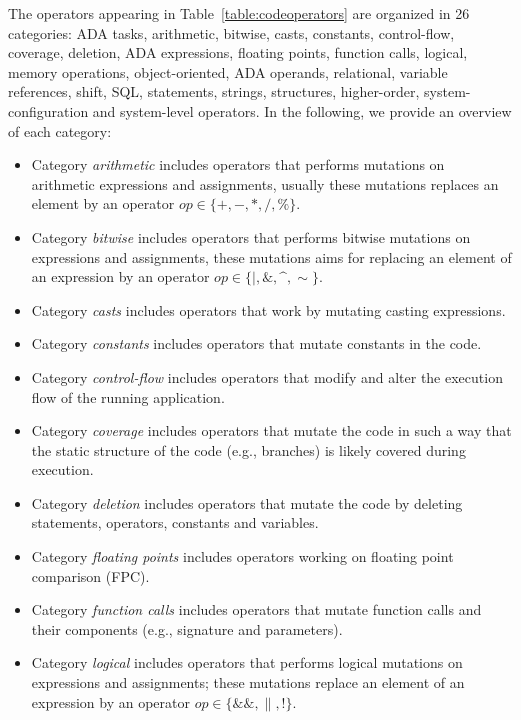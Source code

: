 The operators appearing in Table~\ref{table:codeoperators} are organized in 26 categories: ADA tasks, arithmetic, bitwise, casts, constants, control-flow, coverage, deletion, ADA expressions, floating points, function calls, logical, memory operations, object-oriented, ADA operands, relational, variable references, shift, SQL, statements, strings, structures, higher-order, system-configuration and system-level operators.  In the following, we provide an overview of each category:
\begin{itemize}
\item Category \emph{arithmetic} includes operators that performs mutations on arithmetic expressions and assignments, usually these mutations replaces an element by an operator $op \in \{+, -, *, /, \%\}$. 
\item Category \emph{bitwise} includes operators that performs bitwise mutations on expressions and assignments, these mutations aims for replacing an element of an expression by an operator $op \in \{\mid, \&, \^{}, \sim\}$. 
\item Category \emph{casts} includes operators that work by mutating casting expressions.
\item Category \emph{constants} includes operators that mutate constants in the code. 
\item Category \emph{control-flow} includes operators that modify and alter the execution flow of the running application.
\item Category \emph{coverage} includes operators that mutate the code in such a way that the static structure of the code (e.g., branches) is likely covered during execution.
\item Category \emph{deletion} includes operators that mutate the code by deleting statements, operators, constants and variables.  
\item Category \emph{floating points} includes operators working on floating point comparison (FPC).
\item Category \emph{function calls} includes operators that mutate function calls and their components (e.g., signature and parameters).
\item Category \emph{logical} includes operators that performs logical mutations on expressions and assignments; these mutations replace an element of an expression by an operator $op \in \{\&\&, \|, !\}$.

\end{itemize}
